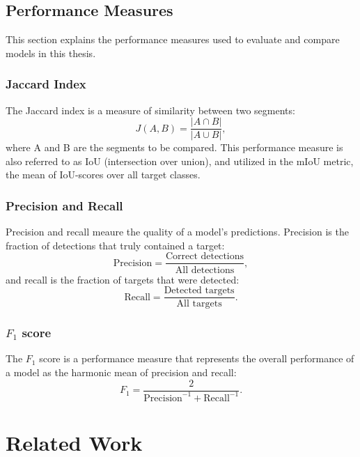 \documentclass[english, 12pt, a4paper, sci, utf8, a-2b, online]{aaltothesis}
\begin{document}
\subsection{Performance Measures}

This section explains the performance measures used to evaluate and compare models in this thesis.

\subsubsection{Jaccard Index}

The Jaccard index \cite{jaccard} is a measure of similarity between two segments:
\begin{equation}
J(A, B) = \frac{|A \cap B|}{|A \cup B |},
\end{equation}
where A and B are the segments to be compared. This performance measure is also referred to as IoU (intersection over union), and utilized in the mIoU metric, the mean of IoU-scores over all target classes.

\subsubsection{Precision and Recall}

Precision and recall meaure the quality of a model's predictions. Precision is the fraction of detections that truly contained a target:
\begin{equation}
    \text{Precision} = \frac{\text{Correct detections}}{\text{All detections}}, 
\end{equation}
and recall is the fraction of targets that were detected:
\begin{equation}
    \text{Recall} = \frac{\text{Detected targets}}{\text{All targets}}.
\end{equation}

\subsubsection{$F_1$ score}

The $F_1$ score is a performance measure that represents the overall performance of a model as the harmonic mean of precision and recall:
\begin{equation}
    F_1 = \frac{2}{\text{Precision}^{-1} + \text{Recall}^{-1}}.
\end{equation}



\newpage
\section{Related Work}
\end{document}
